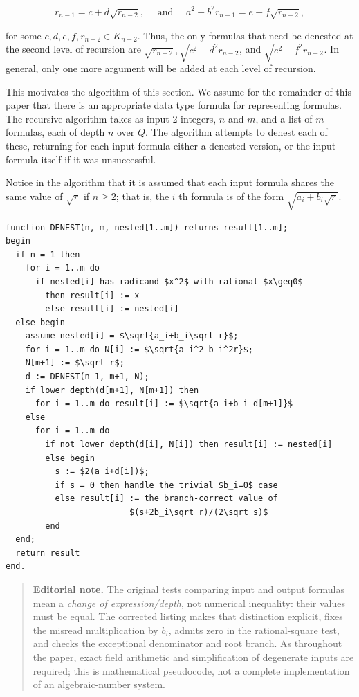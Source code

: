 \documentclass[11pt,letterpaper]{article}
\newcommand{\editorialnote}[1]{\begin{quote}\small\noindent
  \textbf{Editorial note.} #1\end{quote}}
\begin{document}
\[
r_{n-1}=c+d \sqrt{r_{n-2}}, \quad \text { and } \quad a^{2}-b^{2} r_{n-1}=e+f \sqrt{r_{n-2}},
\]

for some $c, d, e, f, r_{n-2} \in K_{n-2}$. Thus, the only formulas that need be denested at the second level of recursion are $\sqrt{r_{n-2}}, \sqrt{c^{2}-d^{2} r_{n-2}}$, and $\sqrt{e^{2}-f^{2} r_{n-2}}$. In general, only one more argument will be added at each level of recursion.

This motivates the algorithm of this section. We assume for the remainder of this paper that there is an appropriate data type formula for representing formulas. The recursive algorithm takes as input 2 integers, $n$ and $m$, and a list of $m$ formulas, each of depth $n$ over $Q$. The algorithm attempts to denest each of these, returning for each input formula either a denested version, or the input formula itself if it was unsuccessful.

Notice in the algorithm that it is assumed that each input formula shares the same value of $\sqrt{r}$ if $n \geqslant 2$; that is, the $i$ th formula is of the form $\sqrt{a_{i}+b_{i} \sqrt{r}}$.

\begin{lstlisting}[mathescape=true]
function DENEST(n, m, nested[1..m]) returns result[1..m];
begin
  if n = 1 then
    for i = 1..m do
      if nested[i] has radicand $x^2$ with rational $x\geq0$
        then result[i] := x
        else result[i] := nested[i]
  else begin
    assume nested[i] = $\sqrt{a_i+b_i\sqrt r}$;
    for i = 1..m do N[i] := $\sqrt{a_i^2-b_i^2r}$;
    N[m+1] := $\sqrt r$;
    d := DENEST(n-1, m+1, N);
    if lower_depth(d[m+1], N[m+1]) then
      for i = 1..m do result[i] := $\sqrt{a_i+b_i d[m+1]}$
    else
      for i = 1..m do
        if not lower_depth(d[i], N[i]) then result[i] := nested[i]
        else begin
          s := $2(a_i+d[i])$;
          if s = 0 then handle the trivial $b_i=0$ case
          else result[i] := the branch-correct value of
                         $(s+2b_i\sqrt r)/(2\sqrt s)$
        end
  end;
  return result
end.
\end{lstlisting}
\editorialnote{The original tests comparing input and output formulas mean a \emph{change of expression/depth}, not numerical inequality: their values must be equal. The corrected listing makes that distinction explicit, fixes the misread multiplication by $b_i$, admits zero in the rational-square test, and checks the exceptional denominator and root branch. As throughout the paper, exact field arithmetic and simplification of degenerate inputs are required; this is mathematical pseudocode, not a complete implementation of an algebraic-number system.}
\end{document}
